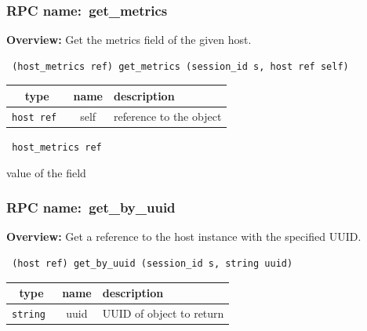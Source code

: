 \subsubsection{RPC name:~get\_metrics}

{\bf Overview:} 
Get the metrics field of the given host.

\begin{verbatim} (host_metrics ref) get_metrics (session_id s, host ref self)\end{verbatim}



 
\vspace{0.3cm}
\begin{tabular}{|c|c|p{7cm}|}
 \hline
{\bf type} & {\bf name} & {\bf description} \\ \hline
{\tt host ref } & self & reference to the object \\ \hline 

\end{tabular}

\vspace{0.3cm}

{\tt 
host\_metrics ref
}


value of the field
\vspace{0.3cm}
\vspace{0.3cm}
\vspace{0.3cm}
\subsubsection{RPC name:~get\_by\_uuid}

{\bf Overview:} 
Get a reference to the host instance with the specified UUID.

\begin{verbatim} (host ref) get_by_uuid (session_id s, string uuid)\end{verbatim}



 
\vspace{0.3cm}
\begin{tabular}{|c|c|p{7cm}|}
 \hline
{\bf type} & {\bf name} & {\bf description} \\ \hline
{\tt string } & uuid & UUID of object to return \\ \hline 

\end{tabular}


